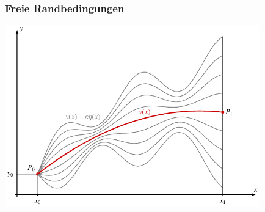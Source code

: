 %
%
%
\bgroup
\begin{frame}[t]
\setlength{\abovedisplayskip}{5pt}
\setlength{\belowdisplayskip}{5pt}
\frametitle{Freie Randbedingungen}
\vspace{-12pt}
\begin{center}
\includegraphics[width=0.83\textwidth]{../../buch/chapters/020-variation/images/variation1.pdf}
\end{center}
\end{frame}
\egroup
